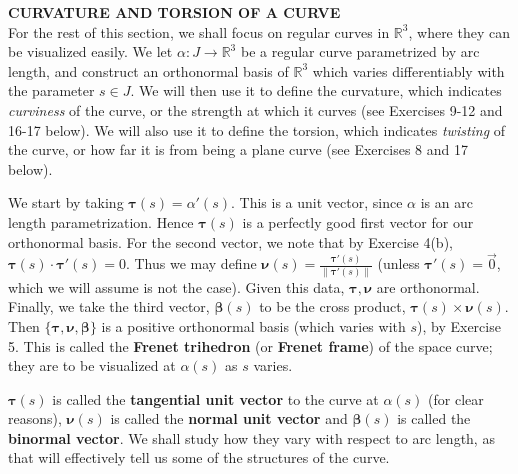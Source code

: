 \documentclass[leqno]{book}
\begin{document}
\noindent\textbf{CURVATURE AND TORSION OF A CURVE}\\

\noindent For the rest of this section, we shall focus on regular curves in $\mathbb R^3$, where they can be visualized easily.  We let $\alpha:J\to\mathbb R^3$ be a regular curve parametrized by arc length, and construct an orthonormal basis of $\mathbb R^3$ which varies differentiably with the parameter $s\in J$.  We will then use it to define the curvature, which indicates \emph{curviness} of the curve, or the strength at which it curves (see Exercises 9-12 and 16-17 below).  We will also use it to define the torsion, which indicates \emph{twisting} of the curve, or how far it is from being a plane curve (see Exercises 8 and 17 below).

We start by taking $\boldsymbol\tau(s)=\alpha'(s)$.  This is a unit vector, since $\alpha$ is an arc length parametrization.  Hence $\boldsymbol\tau(s)$ is a perfectly good first vector for our orthonormal basis.  For the second vector, we note that by Exercise 4(b), $\boldsymbol\tau(s)\cdot\boldsymbol\tau'(s)=0$.  Thus we may define $\boldsymbol\nu(s)=\frac{\boldsymbol\tau'(s)}{\|\boldsymbol\tau'(s)\|}$ (unless $\boldsymbol\tau'(s)=\vec 0$, which we will assume is not the case).  Given this data, $\boldsymbol\tau,\boldsymbol\nu$ are orthonormal.  Finally, we take the third vector, $\boldsymbol\beta(s)$ to be the cross product, $\boldsymbol\tau(s)\times\boldsymbol\nu(s)$.  Then $\{\boldsymbol\tau,\boldsymbol\nu,\boldsymbol\beta\}$ is a positive orthonormal basis (which varies with $s$), by Exercise 5.  This is called the \textbf{Frenet trihedron} (or \textbf{Frenet frame}) of the space curve; they are to be visualized at $\alpha(s)$ as $s$ varies.

$\boldsymbol\tau(s)$ is called the \textbf{tangential unit vector} to the curve at $\alpha(s)$ (for clear reasons), $\boldsymbol\nu(s)$ is called the \textbf{normal unit vector} and $\boldsymbol\beta(s)$ is called the \textbf{binormal vector}.  We shall study how they vary with respect to arc length, as that will effectively tell us some of the structures of the curve.
\end{document}
